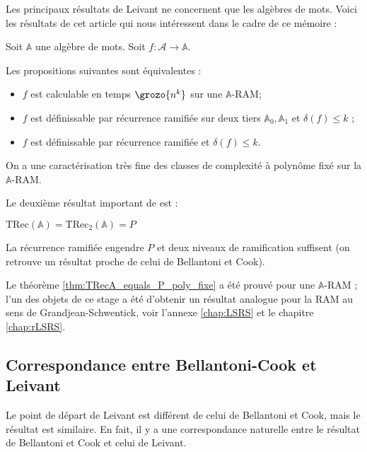 \documentclass{report}
\newcommand{\bbA}{\mathbb{A}}
\newcommand{\TRec}[1]{\text{TRec}\left(\mathbb{#1}\right)}
\newcommand{\TRecd}[1]{\text{TRec}_{2}\left(\mathbb{#1}\right)}
\begin{document}
			\espace
			
			Les principaux résultats de Leivant ne concernent que les algèbres de mots. Voici les résultats de cet article \cite{Leivant1995} qui nous intéressent dans le cadre de ce mémoire :
			
			\begin{theorem}
				\label{thm:TRecA_equals_P_poly_fixe}
				Soit $\bbA$ une algèbre de mots. Soit $f : \mathcal{A} \to \bbA $.
				
				Les propositions suivantes sont équivalentes :
	
				\begin{itemize}[itemsep=-1mm]
					\item 	$f$ est calculable en temps $\grozo{n^k}$ sur une $\bbA$-RAM;
					\item 	$f$ est définissable par récurrence ramifiée sur deux tiers $\bbA_0, \bbA_1$ et $\delta(f) \leq k$ ;
					\item 	$f$ est définissable par récurrence ramifiée et $\delta(f) \leq k$.
				\end{itemize}
			\end{theorem}
			
			On a une caractérisation très fine des classes de complexité à polynôme fixé sur la $\bbA$-RAM.
			
			Le deuxième résultat important de \cite{Leivant1995} est :
			
			\begin{theorem}
				\label{thm:TRecA_equals_P}
				$\TRec{A} = \TRecd{A} = P$
			\end{theorem}
			
			La récurrence ramifiée engendre $P$ et deux niveaux de ramification suffisent (on retrouve un résultat proche de celui de Bellantoni et Cook).
		
			Le théorème \ref{thm:TRecA_equals_P_poly_fixe} a été prouvé pour une $\bbA$-RAM ; l'un des objets de ce stage a été d'obtenir un résultat analogue pour la RAM au sens de Grandjean-Schwentick, voir l'annexe \ref{chap:LSRS} et le chapitre \ref{chap:rLSRS}.
			
		
	
		\subsection{Correspondance entre Bellantoni-Cook et Leivant}
		\label{subsec:corres_BC_Leivant}
	
			Le point de départ de Leivant est différent de celui de Bellantoni et Cook, mais le résultat est similaire. En fait, il y a une correspondance naturelle entre le résultat de Bellantoni et Cook et celui de Leivant.
			
\end{document}
